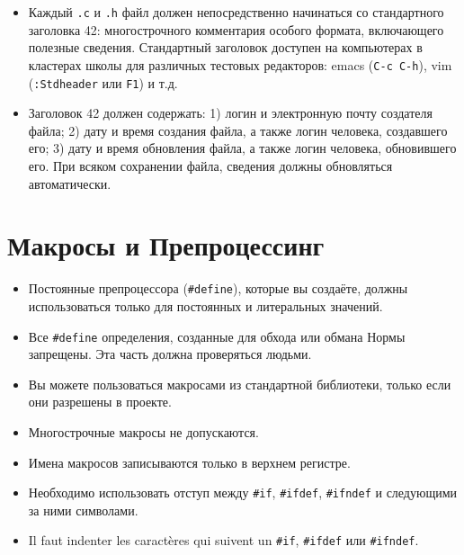\documentclass{42-ru}
\begin{document}
        \begin{itemize}

        \item Каждый \texttt{.c}  и \texttt{.h}  файл должен непосредственно начинаться со стандартного заголовка 42:
            многострочного комментария особого формата, включающего полезные сведения.
            Стандартный заголовок доступен на компьютерах в кластерах школы для различных
            тестовых редакторов: emacs (\texttt{C-c C-h}), vim (\texttt{:Stdheader} или \texttt{F1}) и т.д.

        \item Заголовок 42 должен содержать: 1) логин и электронную почту создателя файла;
            2) дату и время создания файла, а также логин человека, создавшего его;
            3) дату и время обновления файла, а также логин человека, обновившего его.
            При всяком сохранении файла, сведения должны обновляться автоматически.

        \end{itemize}

    \newpage


    \section{Макросы и Препроцессинг}

        \begin{itemize}

            \item Постоянные препроцессора (\texttt{#define}), которые вы создаёте, должны использоваться только для постоянных и литеральных значений.

            \item Все \texttt{#define} определения, созданные для обхода или обмана Нормы запрещены. Эта часть должна проверяться людьми.

            \item Вы можете пользоваться макросами из стандартной библиотеки, только если они разрешены в проекте.

            \item Многострочные макросы не допускаются.

            \item Имена макросов записываются только в верхнем регистре.

            \item Необходимо использовать отступ между \texttt{\#if}, \texttt{\#ifdef}, \texttt{\#ifndef} и следующими за ними символами.
            \item Il faut indenter les caractères qui suivent un \texttt{\#if}, \texttt{\#ifdef} или \texttt{\#ifndef}.

        \end{itemize}
\end{document}
